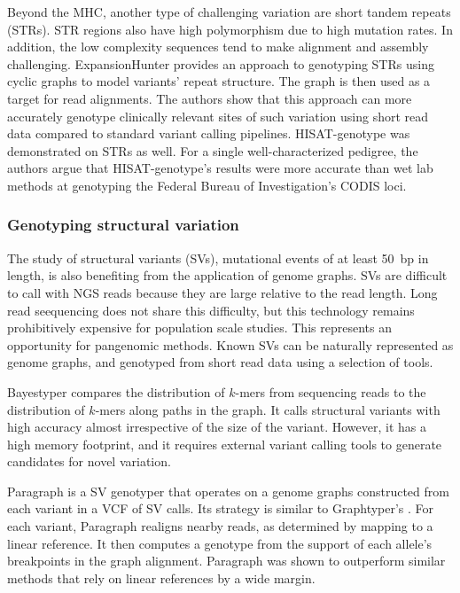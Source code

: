 Beyond the MHC, another type of challenging variation are short tandem repeats (STRs).
STR regions also have high polymorphism due to high mutation rates.
In addition, the low complexity sequences tend to make alignment and assembly challenging.
ExpansionHunter \cite{dolzhenko2019expansionhunter} provides an approach to genotyping STRs using cyclic graphs to model variants' repeat structure.
The graph is then used as a target for read alignments.
The authors show that this approach can more accurately genotype clinically relevant sites of such variation using short read data compared to standard variant calling pipelines.
HISAT-genotype \cite{Kim_2019} was demonstrated on STRs as well. 
For a single well-characterized pedigree, the authors argue that HISAT-genotype's results were more accurate than wet lab methods at genotyping the Federal Bureau of Investigation's CODIS loci.

\subsubsection{Genotyping structural variation}

The study of structural variants (SVs), mutational events of at least 50~bp in length, is also benefiting from the application of genome graphs.
SVs are difficult to call with NGS reads because they are large relative to the read length.
Long read seequencing does not share this difficulty, but this technology remains prohibitively expensive for population scale studies.
This represents an opportunity for pangenomic methods.
Known SVs can be naturally represented as genome graphs, and genotyped from short read data using a selection of tools.

Bayestyper \cite{sibbesen2018accurate} compares the distribution of $k$-mers from sequencing reads to the distribution of $k$-mers along paths in the graph.
It calls structural variants with high accuracy almost irrespective of the size of the variant.
However, it has a high memory footprint, and it requires external variant calling tools to generate candidates for novel variation.

Paragraph \cite{chen2019paragraph} is a SV genotyper that operates on a genome graphs constructed from each variant in a VCF of SV calls.
Its strategy is similar to Graphtyper's \cite{eggertsson2017graphtyper}.
For each variant, Paragraph realigns nearby reads, as determined by mapping to a linear reference.
It then computes a genotype from the support of each allele's breakpoints in the graph alignment.
Paragraph was shown to outperform similar methods that rely on linear references by a wide margin.

